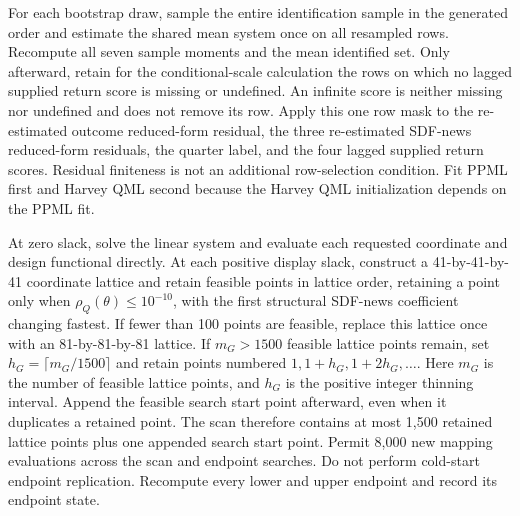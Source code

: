 \documentclass[11pt]{article}
\begin{document}
For each bootstrap draw, sample the entire identification sample in the generated order and estimate
the shared mean system once on all resampled rows. Recompute all seven sample moments and the mean
identified set. Only afterward, retain for the conditional-scale calculation the rows on which no
lagged supplied return score is missing or undefined. An infinite score is neither missing nor
undefined and does not remove its row. Apply this one row mask to the re-estimated outcome
reduced-form residual, the three re-estimated SDF-news reduced-form residuals, the quarter label, and
the four lagged supplied return scores. Residual finiteness is not an additional row-selection condition. Fit PPML
first and Harvey QML second because the Harvey QML initialization depends on the PPML fit.

At zero slack, solve the linear system and evaluate each requested coordinate and design functional directly.
At each positive display slack, construct a 41-by-41-by-41 coordinate lattice and retain feasible points in
lattice order, retaining a point only when \(\rho_Q(\theta)\le10^{-10}\), with the first structural
SDF-news coefficient changing fastest. If fewer than 100
points are feasible, replace this lattice once with an 81-by-81-by-81 lattice. If \(m_G>1500\)
feasible lattice points remain, set \(h_G=\lceil m_G/1500\rceil\) and retain points numbered
\(1,1+h_G,1+2h_G,\ldots\). Here \(m_G\) is the number of feasible lattice points, and \(h_G\) is
the positive integer thinning interval. Append the feasible search start point afterward, even when it
duplicates a retained point. The scan therefore contains at most 1,500 retained lattice points plus
one appended search start point. Permit 8,000 new mapping evaluations across the scan and endpoint searches. Do not perform cold-start endpoint
replication. Recompute every lower and upper endpoint and record its endpoint state.
\end{document}
